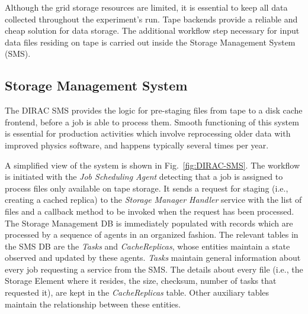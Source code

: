 \documentclass[sort&compress,preprint,3p]{elsarticle}
\begin{document}
Although the grid storage resources are limited, it is essential to keep all
data collected throughout the experiment's run. Tape backends provide a reliable
and cheap solution for data storage. The additional workflow step 
necessary for input data files residing on tape is carried out inside the
Storage Management System (SMS).

\subsection{Storage Management System}

The DIRAC SMS provides the logic for pre-staging files from tape to a disk cache
frontend, before a job is able to process them. Smooth functioning of this
system is essential for production activities which involve reprocessing 
older data with improved physics software, and happens typically several times
per year.

A simplified view of the system is shown in  Fig.~\ref{fig:DIRAC-SMS}. The workflow is initiated
with the \textit{Job Scheduling Agent} detecting that a job is assigned to process files
only available on tape storage. It sends a request for staging (i.e., creating a
cached replica) to the \textit{Storage Manager Handler} service with the
list of files and a callback method to be invoked when the request has been
processed. The Storage Management DB is immediately populated with records which
are processed by a sequence of agents in an organized fashion. The relevant
tables in the SMS DB are the \textit{Tasks} and \textit{CacheReplicas}, whose
entities maintain a state observed and updated by these agents. \textit{Tasks} maintain
general information about every job requesting a service from the SMS. The
details about every file (i.e., the Storage Element where it resides, the
size, checksum, number of tasks that requested it), are kept in the \textit{CacheReplicas}
table. Other auxiliary tables maintain the relationship between these entities.
\end{document}
